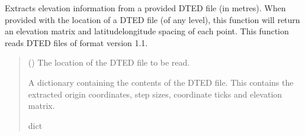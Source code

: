 \documentclass[letterpaper,10pt,english]{sphinxmanual}
\begin{document}

\begin{fulllineitems}
\label{\detokenize{modules/earth/dted:qnav.earth.dted.read_dted_file}}
\pysigstartsignatures
{}
\pysigstopsignatures
\sphinxAtStartPar
Extracts elevation information from a provided DTED file (in metres).
When provided with the location of a DTED file (of any level), this
function will return an elevation matrix and latitude\sphinxhyphen{}longitude spacing
of each point. This function reads DTED files of format version 1.1.
\begin{quote}\begin{description}
\sphinxAtStartPar
{} () \textendash{} The location of the DTED file to be read.

\sphinxAtStartPar
A dictionary containing the contents of the DTED file.
This contains the extracted origin coordinates, step sizes,
coordinate ticks and elevation matrix.

\sphinxAtStartPar
dict

\end{description}\end{quote}

\end{fulllineitems}

\end{document}
